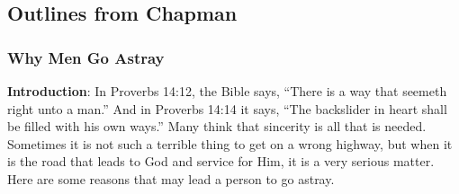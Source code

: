 \subsection{Outlines from Chapman}

\subsubsection{Why Men Go Astray}
\textbf{Introduction}:  In Proverbs 14:12, the Bible says, ``There is a way that seemeth right unto a man.'' And in Proverbs 14:14 it says, ``The backslider in heart shall be filled with his own ways.'' Many think that sincerity is all that is needed. Sometimes it is not such a terrible thing to get on a wrong highway, but when it is the road that leads to God and service for Him, it is a very serious matter. Here are some reasons that may lead a person to go astray.
